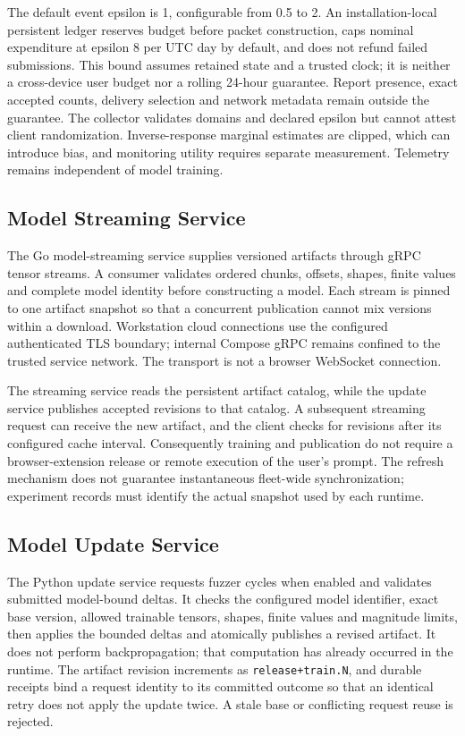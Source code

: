 \documentclass[conference]{IEEEtran}
\begin{document}
The default event epsilon is 1, configurable from 0.5 to 2. An installation-local persistent ledger reserves budget before packet construction, caps nominal expenditure at epsilon 8 per UTC day by default, and does not refund failed submissions. This bound assumes retained state and a trusted clock; it is neither a cross-device user budget nor a rolling 24-hour guarantee. Report presence, exact accepted counts, delivery selection and network metadata remain outside the guarantee. The collector validates domains and declared epsilon but cannot attest client randomization. Inverse-response marginal estimates are clipped, which can introduce bias, and monitoring utility requires separate measurement. Telemetry remains independent of model training.

\subsection{Model Streaming Service}

The Go model-streaming service supplies versioned artifacts through gRPC tensor streams. A consumer validates ordered chunks, offsets, shapes, finite values and complete model identity before constructing a model. Each stream is pinned to one artifact snapshot so that a concurrent publication cannot mix versions within a download. Workstation cloud connections use the configured authenticated TLS boundary; internal Compose gRPC remains confined to the trusted service network. The transport is not a browser WebSocket connection.

The streaming service reads the persistent artifact catalog, while the update service publishes accepted revisions to that catalog. A subsequent streaming request can receive the new artifact, and the client checks for revisions after its configured cache interval. Consequently training and publication do not require a browser-extension release or remote execution of the user's prompt. The refresh mechanism does not guarantee instantaneous fleet-wide synchronization; experiment records must identify the actual snapshot used by each runtime.

\subsection{Model Update Service}

The Python update service requests fuzzer cycles when enabled and validates submitted model-bound deltas. It checks the configured model identifier, exact base version, allowed trainable tensors, shapes, finite values and magnitude limits, then applies the bounded deltas and atomically publishes a revised artifact. It does not perform backpropagation; that computation has already occurred in the runtime. The artifact revision increments as \texttt{release+train.N}, and durable receipts bind a request identity to its committed outcome so that an identical retry does not apply the update twice. A stale base or conflicting request reuse is rejected.
\end{document}
